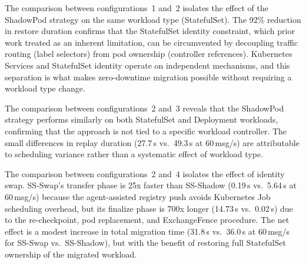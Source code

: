 \documentclass[conference]{IEEEtran}
\begin{document}
The comparison between configurations~1 and~2 isolates the effect of the
ShadowPod strategy on the same workload type (StatefulSet). The 92\% reduction
in restore duration confirms that the StatefulSet identity constraint, which
prior work treated as an inherent limitation, can be circumvented by
decoupling traffic routing (label selectors) from pod ownership (controller
references). Kubernetes Services and StatefulSet identity operate on
independent mechanisms, and this separation is what makes zero-downtime
migration possible without requiring a workload type change.

The comparison between configurations~2 and~3 reveals that the ShadowPod
strategy performs similarly on both StatefulSet and Deployment workloads,
confirming that the approach is not tied to a specific workload controller.
The small differences in replay duration (27.7\,s vs.\ 49.3\,s at 60\,msg/s)
are attributable to scheduling variance rather than a systematic effect of
workload type.

The comparison between configurations~2 and~4 isolates the effect of
identity swap. SS-Swap's transfer phase is 25x faster than
SS-Shadow (0.19\,s vs.\ 5.64\,s at 60\,msg/s) because the agent-assisted
registry push avoids Kubernetes Job scheduling overhead, but its finalize phase is 700x longer (14.73\,s vs.\ 0.02\,s) due to
the re-checkpoint, pod replacement, and ExchangeFence procedure. The net effect
is a modest increase in total migration time (31.8\,s vs.\ 36.0\,s at 60\,msg/s
for SS-Swap vs.\ SS-Shadow), but with the benefit of restoring full StatefulSet
ownership of the migrated workload.
\end{document}
